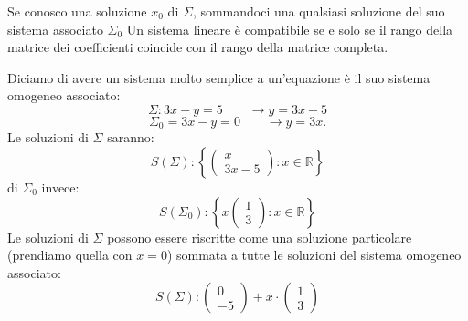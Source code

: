 \documentclass[x11names]{article}
\begin{document}
 

\noindent
Se conosco una soluzione $x_0$ di $\Sigma$, sommandoci una qualsiasi soluzione del suo sistema associato $\Sigma_{0}$ Un sistema lineare è compatibile se e solo se il rango della matrice dei coefficienti coincide con il rango della matrice completa.


Diciamo di avere un sistema molto semplice a un'equazione è il suo sistema omogeneo associato:
\[	
\Sigma : 3x - y = 5 \qquad \rightarrow y = 3x - 5 
\] 
\[
\Sigma_{0} = 3x - y = 0 \qquad \rightarrow y = 3x
.\] 
Le soluzioni di $\Sigma$ saranno:
\[
S\left(\Sigma\right): \left\{\left(\begin{array}{c} x  \\ 3x - 5\end{array}\right): x \in \mathbb{R}\right\}
\] 
di $\Sigma_0$ invece:
\[
S\left(\Sigma_0\right): \left\{x\left(\begin{array}{c} 1  \\ 3\end{array}\right): x \in \mathbb{R}\right\}
\] 
Le soluzioni di $\Sigma$ possono essere riscritte come una soluzione particolare (prendiamo quella con  $x=0$) sommata a tutte le soluzioni del sistema omogeneo associato:
 \[
 S\left(\Sigma\right): \left(\begin{array}{c} 0 \\ -5\end{array}\right) + x\cdot \left(\begin{array}{c} 1 \\ 3\end{array}\right)
\] 
\end{document}
